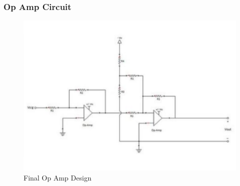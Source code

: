 \documentclass{beamer}
\begin{document}
\begin{frame}
	\frametitle{Op Amp Circuit}
	\begin{figure}
		\centering 
		\includegraphics[scale=.3]{figures/opampfinal.pdf}
		\caption{Final Op Amp Design}
	\end{figure}	
\end{frame}
\end{document}
